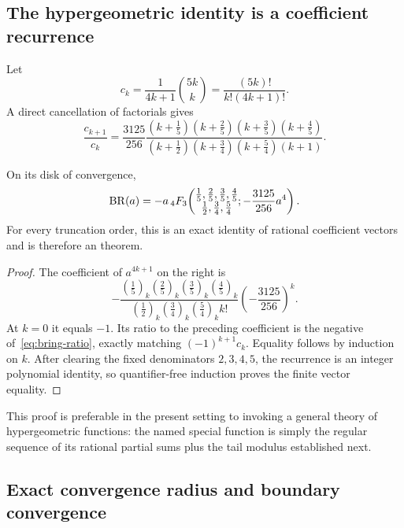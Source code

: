 \subsection{The hypergeometric identity is a coefficient recurrence}

Let
\[
 c_k=\frac{1}{4k+1}\binom{5k}{k}
     =\frac{(5k)!}{k!(4k+1)!}.
\]
A direct cancellation of factorials gives
\begin{equation}\label{eq:bring-ratio}
 \frac{c_{k+1}}{c_k}
 =\frac{3125}{256}
 \frac{(k+\frac15)(k+\frac25)(k+\frac35)(k+\frac45)}
 {(k+\frac12)(k+\frac34)(k+\frac54)(k+1)}.
\end{equation}

\begin{theorem}\label{thm:bring-hypergeom}
On its disk of convergence,
\begin{equation}\label{eq:bring-hypergeom}
 \operatorname{BR}(a)=-a\,{}_4F_3\!\left(
 \begin{matrix}\frac15,\frac25,\frac35,\frac45\\
               \frac12,\frac34,\frac54
 \end{matrix};-\frac{3125}{256}a^4\right).
\end{equation}
For every truncation order, this is an exact identity of rational coefficient
vectors and is therefore an \ipra{} theorem.
\end{theorem}

\begin{proof}
The coefficient of \(a^{4k+1}\) on the right is
\[
 -\frac{(\frac15)_k(\frac25)_k(\frac35)_k(\frac45)_k}
 {(\frac12)_k(\frac34)_k(\frac54)_k k!}
 \left(-\frac{3125}{256}\right)^k.
\]
At \(k=0\) it equals \(-1\).  Its ratio to the preceding coefficient is the
negative of~\eqref{eq:bring-ratio}, exactly matching
\((-1)^{k+1}c_k\).  Equality follows by induction on \(k\).  After clearing the
fixed denominators \(2,3,4,5\), the recurrence is an integer polynomial
identity, so quantifier-free induction proves the finite vector equality.
\end{proof}

This proof is preferable in the present setting to invoking a general theory
of hypergeometric functions: the named special function is simply the regular
sequence of its rational partial sums plus the tail modulus established next.

\subsection{Exact convergence radius and boundary convergence}

